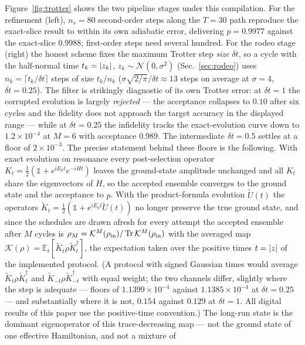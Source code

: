 \documentclass[
  aps,            %
  prc,            %
  reprint,        %
  superscriptaddress,
  floatfix,
  nofootinbib
]{revtex4-2}
\begin{document}
Figure~\ref{fig:trotter} shows the two pipeline stages under this compilation.
For the refinement (left), $n_s=80$ second-order steps along the $T=30$ path
reproduce the exact-slice result to within its own adiabatic error, delivering
$p=0.9977$ against the exact-slice $0.9988$; first-order steps need several
hundred.  For the rodeo stage (right) the honest scheme fixes the maximum
Trotter step \emph{size} $\delta t$, so a cycle with the half-normal time
$t_k=\abs{z_k}$, $z_k\sim\mathcal N(0,\sigma^2)$ (Sec.~\ref{sec:rodeo}) uses
$n_k=\lceil t_k/\delta t\rceil$ steps of size $t_k/n_k$
($\sigma\sqrt{2/\pi}/\delta t\approx13$ steps on average at $\sigma=4$,
$\delta t=0.25$).  The filter is strikingly diagnostic of its own Trotter
error: at $\delta t=1$ the corrupted evolution is largely \emph{rejected} ---
the acceptance collapses to $0.10$ after six cycles and the fidelity does not
approach the target accuracy in the displayed range --- while at
$\delta t=0.25$ the infidelity tracks the exact-evolution curve down to
$1.2\times10^{-4}$ at $M=6$ with acceptance $0.989$.  The intermediate
$\delta t=0.5$ settles at a floor of $2\times10^{-3}$.  The precise
statement behind these floors is the following.  With exact evolution on
resonance every post-selection operator $K_t=\tfrac12(\mathbb1+e^{iE_0t}e^{-iHt})$
leaves the ground-state amplitude unchanged and all $K_t$ share the
eigenvectors of $H$, so the accepted ensemble converges to the ground state
and the acceptance to $p$.  With the product-formula evolution $\tilde U(t)$
the operators $\tilde K_t=\tfrac12(\mathbb1+e^{iE_0t}\tilde U(t))$ no longer
preserve the true ground state, and since the schedules are drawn afresh
for every attempt the accepted ensemble after $M$ cycles is
$\rho_M=\mathcal K^M(\rho_{\rm in})/\Tr\mathcal K^M(\rho_{\rm in})$ with the
averaged map $\mathcal K(\rho)=\mathbb E_t[\tilde K_t\rho\tilde K_t^\dagger]$,
the expectation taken over the positive times $t=\abs{z}$ of the implemented
protocol.  (A protocol with signed Gaussian times would average
$\tilde K_t\rho\tilde K_t^\dagger$ and $\tilde K_{-t}\rho\tilde K_{-t}^\dagger$
with equal weight; the two channels differ, slightly where the step is
adequate --- floors of $1.1399\times10^{-4}$ against $1.1385\times10^{-4}$ at
$\delta t=0.25$ --- and substantially where it is not, $0.154$ against
$0.129$ at $\delta t=1$.  All digital results of this paper use the
positive-time convention.)
The long-run state is the dominant eigenoperator of this trace-decreasing map
--- not the ground state of one effective Hamiltonian, and not a mixture of
\end{document}
